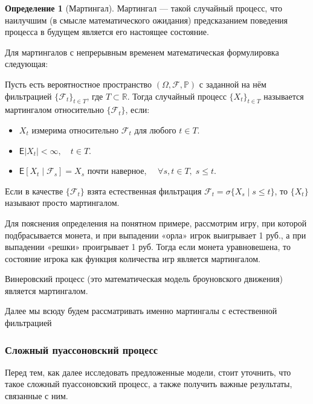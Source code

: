 \documentclass[a4paper,12pt]{article}
\theoremstyle{definition}
\newtheorem{definition}{Определение}[section]
\begin{document}
\begin{definition}[Мартингал]
    \label{def:martingale}
    Мартингал — такой случайный процесс, что наилучшим (в смысле математического ожидания) предсказанием поведения процесса в будущем является его настоящее состояние.
    
    Для мартингалов с непрерывным временем математическая формулировка следующая:
    
    Пусть есть вероятностное пространство $(\Omega ,{\mathcal {F}},\mathbb {P} )$ с заданной на нём фильтрацией $\{{\mathcal {F}}_{t}\}_{t\in T}$, где $T\subset \mathbb {R}$. Тогда случайный процесс $\{X_{t}\}_{t\in T}$ называется мартингалом относительно $\{{\mathcal {F}}_{t}\}$, если:
    
    \begin{itemize}
        \item $X_{t}$ измерима относительно ${\mathcal {F}}_{t}$ для любого $t\in T$.
        \item ${\mathsf {E}}|X_{t}|<\infty ,\quad t\in T$.
        \item ${\mathsf {E}}[X_{t}\mid {\mathcal {F}}_{s}]=X_{s}$ почти наверное, $\quad \forall s,t\in T,\;s\leq t.$
    \end{itemize}

    Если в качестве $\{{\mathcal {F}}_{t}\}$ взята естественная фильтрация ${\mathcal {F}}_{t}=\sigma \{X_{s}\mid s\leq t\}$, то $\{X_{t}\}$ называют просто мартингалом.
    
    Для пояснения определения на понятном примере, рассмотрим игру, при которой подбрасывается монета, и при выпадении «орла» игрок выигрывает 1 руб., а при выпадении «решки» проигрывает 1 руб. Тогда если монета уравновешена, то состояние игрока как функция количества игр является мартингалом.
    
    Винеровский процесс (это математическая модель броуновского движения) является мартингалом.

\end{definition}

Далее мы всюду будем рассматривать именно мартингалы с естественной фильтрацией 

\subsubsection{Сложный пуассоновский процесс}\label{sec:compound_poisson}

Перед тем, как далее исследовать предложенные модели, стоит уточнить, что такое сложный пуассоновский процесс, а также получить важные результаты, связанные с ним.
\end{document}
